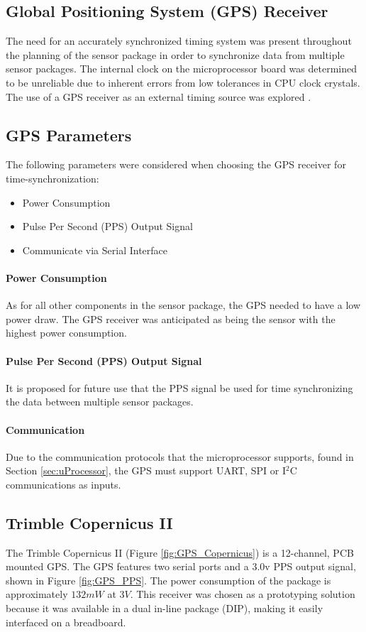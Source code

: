 \subsection{Global Positioning System (GPS) Receiver}
\indent The need for an accurately synchronized timing system was present throughout the planning of the sensor package in order to synchronize data from multiple sensor packages. The internal clock on the microprocessor board was determined to be unreliable due to inherent errors from low tolerances in CPU clock crystals. The use of a GPS receiver as an external timing source was explored \cite{GPSTimeSync}.
\subsection{GPS Parameters}
\label{sec:GPS_Parameters}
\indent The following parameters were considered when choosing the GPS receiver for time-synchronization:
\begin{itemize}
\item Power Consumption 
\item Pulse Per Second (PPS) Output Signal
\item Communicate via Serial Interface
\end{itemize}
\paragraph{Power Consumption}
\label{sec:GPS_power_cons.}
\indent As for all other components in the sensor package, the GPS needed to have a low power draw. The GPS receiver was anticipated as being the sensor with the highest power consumption.
%
\paragraph{Pulse Per Second (PPS) Output Signal}
\label{sec:gps_out_ch_num}
\indent It is proposed for future use that the PPS signal be used for time synchronizing the data between multiple sensor packages.

\paragraph{Communication}
\label{sec:adc_comm}
\indent Due to the communication protocols that the microprocessor supports, found in Section \ref{sec:uProcessor}, the GPS must support UART, SPI or I$^{2}$C communications as inputs.

\subsection{Trimble Copernicus II}
\label{sec:GPS_Trimble}
\indent The Trimble Copernicus II (Figure \ref{fig:GPS_Copernicus}) is a 12-channel, PCB mounted GPS. The GPS features two serial ports and a 3.0v PPS output signal, shown in Figure \ref{fig:GPS_PPS}. The power consumption of the package is approximately $132mW$ at $3V$. This receiver was chosen as a prototyping solution because it was available in a dual in-line package (DIP), making it easily interfaced on a breadboard. 

